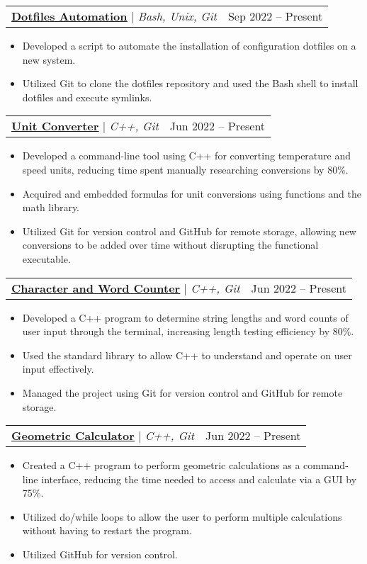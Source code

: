 \documentclass[letterpaper,11pt]{article}
\makeatletter
\newcommand{\resumeItem}[1]{
  \item\small{
    {#1 \vspace{-2pt}}
  }
}
\newcommand{\resumeProjectHeading}[2]{
    \item
    \begin{tabular*}{0.97\textwidth}{l@{\extracolsep{\fill}}r}
      \small#1 & #2 \\
    \end{tabular*}\vspace{-7pt}
}
\newcommand{\resumeItemListStart}{\begin{itemize}}
\newcommand{\resumeItemListEnd}{\end{itemize}\vspace{-5pt}}
\makeatother
\begin{document}
    \resumeProjectHeading
      {\href{https://github.com/jamesrobertsjr/dotfiles-macos}{\underline{\textbf{Dotfiles Automation}}} $|$ \emph{Bash, Unix, Git}}{Sep 2022 -- Present}
      \resumeItemListStart
        \resumeItem{Developed a script to automate the installation of configuration dotfiles on a new system.}
        \resumeItem{Utilized Git to clone the dotfiles repository and used the Bash shell to install dotfiles and execute symlinks.}
      \resumeItemListEnd

    \resumeProjectHeading
      {\href{https://github.com/jamesrobertsjr/unit-converter}{\underline{\textbf{Unit Converter}}} $|$ \emph{C++, Git}}{Jun 2022 -- Present}
      \resumeItemListStart
        \resumeItem{Developed a command-line tool using C++ for converting temperature and speed units, reducing time spent manually researching conversions by 80\%.}
        \resumeItem{Acquired and embedded formulas for unit conversions using functions and the math library.}
        \resumeItem{Utilized Git for version control and GitHub for remote storage, allowing new conversions to be added over time without disrupting the functional executable.}
      \resumeItemListEnd

    \resumeProjectHeading
      {\href{https://github.com/jamesrobertsjr/character-and-word-counter}{\underline{\textbf{Character and Word Counter}}} $|$ \emph{C++, Git}}{Jun 2022 -- Present}
      \resumeItemListStart
        \resumeItem{Developed a C++ program to determine string lengths and word counts of user input through the terminal, increasing length testing efficiency by 80\%.}
        \resumeItem{Used the standard library to allow C++ to understand and operate on user input effectively.}
        \resumeItem{Managed the project using Git for version control and GitHub for remote storage.}
      \resumeItemListEnd
    
    \resumeProjectHeading
      {\href{https://github.com/jamesrobertsjr/geometric-calculator}{\underline{\textbf{Geometric Calculator}}} $|$ \emph{C++, Git}}{Jun 2022 -- Present}
      \resumeItemListStart
        \resumeItem{Created a C++ program to perform geometric calculations as a command-line interface, reducing the time needed to access and calculate via a GUI by 75\%.}
        \resumeItem{Utilized do/while loops to allow the user to perform multiple calculations without having to restart the program.}
        \resumeItem{Utilized GitHub for version control.}
      \resumeItemListEnd
    
\end{document}

